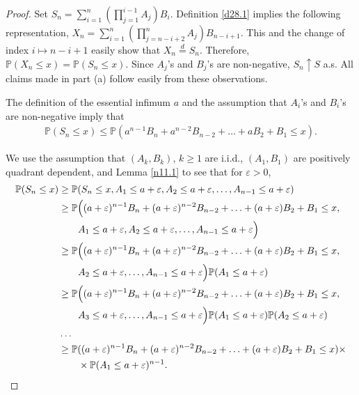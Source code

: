 \documentclass[bj]{imsart}
\numberwithin{equation}{section}
\renewcommand{\P}{\mathbb{P}}
\newcommand{\1}{\mathbf{1}}
\theoremstyle{definition}
\begin{document}
\begin{proof}

Set $S_n=\sum_{i=1}^n \left(\prod_{j=1}^{i-1}A_j\right)B_i$. Definition \eqref{d28.1} implies the following representation, $X_n=\sum_{i=1}^n \left(\prod_{j=n-i+2}^{n}A_j\right)B_{n-i+1}$.
This and the change of index $i\mapsto n-i+1$ easily show that
$X_n\stackrel{d}{=}S_n$. Therefore, $\P(X_{n}\leq x) =\P(S_n\leq x)$. Since $A_j$'s and $B_j$'s are non-negative, $S_n\uparrow S$ a.s. 
All claims made in part (a)  follow easily from these observations. 

The definition of the essential infimum $a$ and the assumption that $A_i$'s and $B_i$'s are non-negative imply that
\begin{align}\label{n12.3}
\P(S_n\leq x)\leq \P(a^{n-1}B_n+a^{n-2}B_{n-2}+\ldots + aB_2+ B_1\leq x).
\end{align}

We use the assumption that $(A_k,B_k)$, $k\geq 1$ are i.i.d., $(A_1,B_1)$ are positively quadrant dependent, and
Lemma \ref{n11.1} to see that for $\varepsilon>0$,
\begin{align}\label{n12.4}
\P(S_n\leq x) & \geq \P(S_n\leq x, A_1\leq a+\varepsilon, A_2\leq a+\varepsilon, \ldots , A_{n-1}\leq a+\varepsilon)\\
 & \geq \P\Big((a+\varepsilon)^{n-1}B_n+(a+\varepsilon)^{n-2}B_{n-2}+\ldots + (a+\varepsilon)B_2+ B_1\leq x, \notag \\
 & \qquad A_1\leq a+\varepsilon, A_2\leq a+\varepsilon, \ldots , A_{n-1}\leq a+\varepsilon\Big) \notag \\
  & \geq \P\Big((a+\varepsilon)^{n-1}B_n+(a+\varepsilon)^{n-2}B_{n-2}+\ldots + (a+\varepsilon)B_2+ B_1\leq x, \notag \\
 & \qquad  A_2\leq a+\varepsilon, \ldots , A_{n-1}\leq a+\varepsilon\Big) \P(A_1\leq a+\varepsilon) \notag \\
   & \geq \P\Big((a+\varepsilon)^{n-1}B_n+(a+\varepsilon)^{n-2}B_{n-2}+\ldots + (a+\varepsilon)B_2+ B_1\leq x, \notag \\
 & \qquad  A_3\leq a+\varepsilon, \ldots , A_{n-1}\leq a+\varepsilon\Big) \P(A_1\leq a+\varepsilon)\P(A_2\leq a+\varepsilon) \notag \\
 & \dots \notag \\
							&\geq \P((a+\varepsilon)^{n-1}B_n+(a+\varepsilon)^{n-2}B_{n-2}+\ldots + (a+\varepsilon)B_2+ B_1\leq x)\times \notag \\
							&\qquad\times \P(A_1\leq a+\varepsilon)^{n-1}. \notag
\end{align}


\end{proof}
\end{document}
